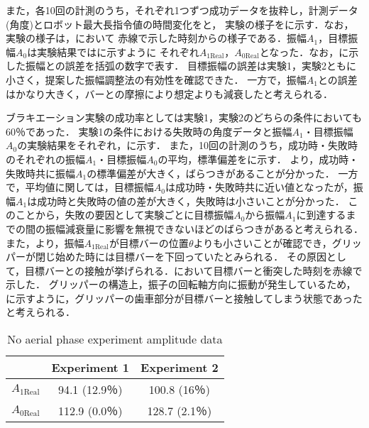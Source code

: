         また，各10回の計測のうち，それぞれ1つずつ成功データを抜粋し，計測データ(角度)とロボット最大長指令値の時間変化をと，
        実験の様子をに示す．なお，実験の様子は，において
        赤線で示した時刻からの様子である．振幅$A_1$，目標振幅$A_0$は実験結果ではに示すように
        それぞれ$A_{\mathrm{1Real}}$，$A_{\mathrm{0Real}}$となった．なお，に示した振幅との誤差を括弧の数字で表す．
        目標振幅の誤差は実験1，実験2ともに小さく，提案した振幅調整法の有効性を確認できた．
        一方で，振幅$A_1$との誤差はかなり大きく，バーとの摩擦により想定よりも減衰したと考えられる．
        
        ブラキエーション実験の成功率としては実験1，実験2のどちらの条件においても60％であった．
        実験1の条件における失敗時の角度データと振幅$A_1$・目標振幅$A_0$の実験結果をそれぞれ，に示す．
        また，10回の計測のうち，成功時・失敗時のそれぞれの振幅$A_1$・目標振幅$A_0$の平均，標準偏差をに示す．
        より，成功時・失敗時共に振幅$A_1$の標準偏差が大きく，ばらつきがあることが分かった．
        一方で，平均値に関しては，目標振幅$A_0$は成功時・失敗時共に近い値となったが，振幅$A_1$は成功時と失敗時の値の差が大きく，失敗時は小さいことが分かった．
        このことから，失敗の要因として実験ごとに目標振幅$A_0$から振幅$A_1$に到達するまでの間の振幅減衰量に影響を無視できないほどのばらつきがあると考えられる．
        また，より，振幅$A_{\mathrm{1Real}}$が目標バーの位置$\theta$よりも小さいことが確認でき，グリッパーが閉じ始めた時には目標バーを下回っていたとみられる．
        その原因として，目標バーとの接触が挙げられる．において目標バーと衝突した時刻を赤線で示した．
        グリッパーの構造上，振子の回転軸方向に振動が発生しているため，
        に示すように，グリッパーの歯車部分が目標バーと接触してしまう状態であったと考えられる．
        \begin{table}[bh]
                \begin{center}
                  \caption{No aerial phase experiment amplitude data}
                  \vspace{2mm}
                  \begin{tabular}{c|cc}
                    \hline
                     & Experiment 1 & Experiment 2\\
                    \hline
                    $A_{\mathrm{1Real}}$ & 94.1 (12.9％)& 100.8 (16％)\\
                    $A_{\mathrm{0Real}}$ & 112.9 (0.0％)& 128.7 (2.1％)\\                      
                    \hline
                  \end{tabular}
                \end{center}
              \end{table}
